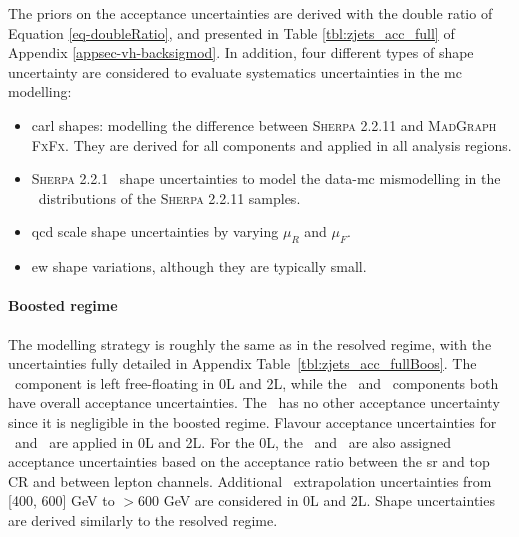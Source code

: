 The priors on the acceptance uncertainties are derived with the double ratio of Equation \ref{eq-doubleRatio}, and presented in Table \ref{tbl:zjets_acc_full} of Appendix \ref{appsec-vh-backsigmod}. In addition, four different types of shape uncertainty are considered to evaluate systematics uncertainties in the \gls{mc} modelling:
\begin{itemize}
    \item \gls{carl} shapes: modelling the difference between \textsc{Sherpa} 2.2.11 and \textsc{MadGraph FxFx}. They are derived for all components and applied in all analysis regions.
    \item \textsc{Sherpa} 2.2.1 \ptv\ shape uncertainties to model the data-\gls{mc} mismodelling in the \ptv\ distributions of the \textsc{Sherpa} 2.2.11 samples. 
    \item \gls{qcd} scale shape uncertainties by varying $\mu_R$ and $\mu_F$.
    \item \gls{ew} shape variations, although they are typically small.
\end{itemize} 

\paragraph{Boosted regime} The modelling strategy is roughly the same as in the resolved regime, with the uncertainties fully detailed in Appendix Table~\ref{tbl:zjets_acc_fullBoos}. The \zhf\ component is left free-floating in 0L and 2L, while the \zmf\ and \zlf\ components both have overall acceptance uncertainties. The \zlf\ has no other acceptance uncertainty since it is negligible in the boosted regime. Flavour acceptance uncertainties for \zhf\ and \zmf\ are applied in 0L and 2L. For the 0L, the \zhf\ and \zmf\ are also assigned acceptance uncertainties based on the acceptance ratio between the \gls{sr} and top CR and between lepton channels. Additional \ptv\ extrapolation uncertainties from [400, 600] GeV to $> 600$ GeV are considered in 0L and 2L. Shape uncertainties are derived similarly to the resolved regime. 

